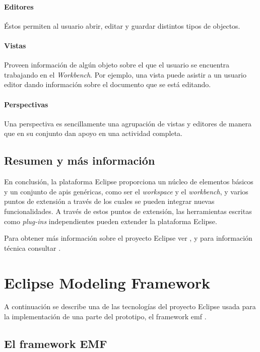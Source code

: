 \documentclass[a4paper,12pt,oneside,spanish]{book}
\begin{document}
\paragraph{Editores} Éstos permiten al usuario abrir, editar y guardar distintos tipos de objectos.

\paragraph{Vistas} Proveen información de algún objeto sobre el que el usuario se encuentra trabajando en el \textit{Workbench}. Por ejemplo, una vista puede asistir a un usuario editor dando información sobre el documento que se está editando.

\paragraph{Perspectivas} Una perspectiva es sencillamente una agrupación de vistas y editores de manera que en su conjunto dan apoyo en una actividad completa.


\subsection{Resumen y más información}

En conclusión, la plataforma \textsf{Eclipse} proporciona un núcleo de elementos básicos y un conjunto de \glspl{api} genéricas, como ser el \textit{workspace} y el \textit{workbench}, y varios puntos de extensión a través de los cuales se pueden integrar nuevas funcionalidades. A través de estos puntos de extensión, las herramientas escritas como \textit{plug-ins} independientes pueden extender la plataforma \textsf{Eclipse}.

Para obtener más información sobre el proyecto \textsf{Eclipse} ver \cite[\url{www.eclipse.org}]{Eclipse}, y para información técnica consultar \cite[Eclipse Platform Technical Overview]{EclipseTech}.


\section{Eclipse Modeling Framework}

A continuación se describe una de las tecnologías del proyecto \textsf{Eclipse} usada para la implementación de una parte del prototipo, el framework \gls{emf} \cite{EMF}.

\subsection{El framework EMF}
\end{document}
